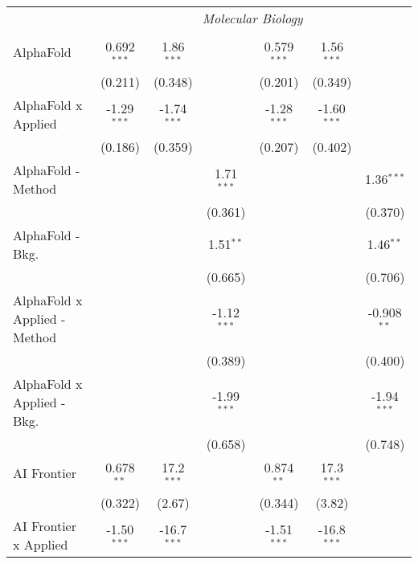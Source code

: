 \begin{tabular}{lcccccc}
 & \multicolumn{6}{c}{\textit{Molecular Biology}} \\ \\
   AlphaFold                      & 0.692$^{***}$ & 1.86$^{***}$  &               & 0.579$^{***}$ & 1.56$^{***}$  &   \\   
                                  & (0.211)       & (0.348)       &               & (0.201)       & (0.349)       &   \\   
   AlphaFold x Applied            & -1.29$^{***}$ & -1.74$^{***}$ &               & -1.28$^{***}$ & -1.60$^{***}$ &   \\   
                                  & (0.186)       & (0.359)       &               & (0.207)       & (0.402)       &   \\   
   AlphaFold - Method             &               &               & 1.71$^{***}$  &               &               & 1.36$^{***}$\\   
                                  &               &               & (0.361)       &               &               & (0.370)\\   
   AlphaFold - Bkg.               &               &               & 1.51$^{**}$   &               &               & 1.46$^{**}$\\   
                                  &               &               & (0.665)       &               &               & (0.706)\\   
   AlphaFold x Applied - Method   &               &               & -1.12$^{***}$ &               &               & -0.908$^{**}$\\   
                                  &               &               & (0.389)       &               &               & (0.400)\\   
   AlphaFold x Applied - Bkg.     &               &               & -1.99$^{***}$ &               &               & -1.94$^{***}$\\   
                                  &               &               & (0.658)       &               &               & (0.748)\\   
   AI Frontier                    & 0.678$^{**}$  & 17.2$^{***}$  &               & 0.874$^{**}$  & 17.3$^{***}$  &   \\   
                                  & (0.322)       & (2.67)        &               & (0.344)       & (3.82)        &   \\   
   AI Frontier x Applied          & -1.50$^{***}$ & -16.7$^{***}$ &               & -1.51$^{***}$ & -16.8$^{***}$ &   \\   

\end{tabular}
